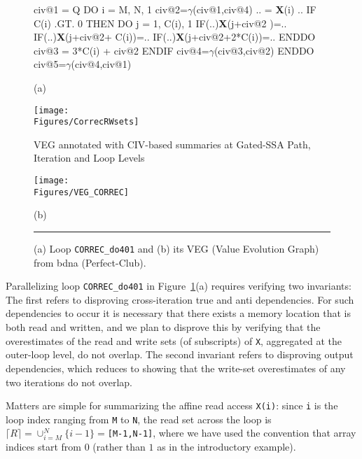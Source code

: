 \documentclass{sig-alternate}
\newcommand{\mymath}[1]{$ #1 $}
\newcommand{\Figures}[1]{../Figures/}
\begin{document}
\begin{figure}
\begin{minipage}{0.48\columnwidth}
\begin{colorcode}
civ@1 = Q
DO i = M, N, 1
 civ@2=\mymath{\gamma}(civ@1,civ@4)
 .. = {\bf X}(i) ..
 IF C(i) .GT. 0 THEN
  DO j = 1, C(i), 1
   IF(..){\bf{}X}(j+civ@2       )=..
   IF(..){\bf{}X}(j+civ@2+  C(i))=..
   IF(..){\bf{}X}(j+civ@2+2*C(i))=..
  ENDDO
  civ@3 = 3*C(i) + civ@2
 ENDIF
 civ@4=\mymath{\gamma}(civ@3,civ@2)
ENDDO
civ@5=\mymath{\gamma}(civ@4,civ@1)  

            (a)
\end{colorcode}
\hspace{2ex}\texttt{[image: \\Figures/CorrecRWsets]}
\end{minipage}
\begin{minipage}{0.45\columnwidth}
\begin{colorcode}
 VEG annotated with CIV-based 
 summaries at Gated-SSA Path, 
  Iteration and Loop Levels
\end{colorcode}
\texttt{[image: \\Figures/VEG\_CORREC]}\vspace{-2ex}
\begin{colorcode}
                (b)
\end{colorcode}
\end{minipage}
\hrule
\caption{(a) Loop {\tt CORREC\_do401} and (b) its VEG (Value Evolution Graph) 
                from {\sc bdna} ({\sc Perfect-Club}).}
\label{fig:codeActforCorrec}
\end{figure}

Parallelizing loop {\tt CORREC\_do401} in Figure~\ref{fig:codeActforCorrec}(a)
requires verifying two invariants: The first refers to disproving 
cross-iteration true and anti dependencies. For such dependencies to occur it 
is necessary that there exists a memory location that is both read and written,
and we plan to disprove this by verifying that the overestimates of the read 
and write sets (of subscripts) of {\tt X}, aggregated at the outer-loop level, 
do not overlap. 
%
The second invariant refers to disproving output dependencies, which reduces to 
showing that the write-set overestimates of any two iterations do not overlap. 

Matters are simple for summarizing the affine 
read access {\tt X(i)}: since {\tt i} is the loop index ranging from {\tt M} to {\tt N}, the
read set across the loop is  {\tt$\lceil R \rceil =\cup_{i=M}^{N}\{i-1\}=$[M-1,N-1]},
where we have used the convention that array indices start from $0$ 
(rather than $1$ as in the introductory example). 
\end{document}
